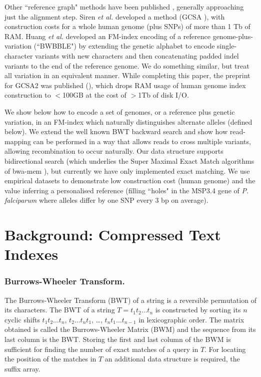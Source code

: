 \documentclass[runningheads,a4paper]{llncs}
\begin{document}
Other ``reference graph" methods have been published \cite{korbinian,siren1,huang}, generally approaching just the alignment step.  Siren \textit{et al.} developed a method (GCSA \cite{siren1}), with construction costs for a whole human genome (plus SNPs) of more than 1 Tb of RAM. Huang \textit{et al.} \cite{huang} developed an FM-index \cite{fmindex} encoding of a reference genome-plus-variation (``BWBBLE") by extending the genetic alphabet to encode single-character variants with new characters and then concatenating padded indel variants to the end of the reference genome. We do something similar, but treat all variation in an equivalent manner.  While completing this paper, the preprint for GCSA2 was published (\cite{siren2}), which drops RAM usage of human genome index construction to $<$100GB at the cost of $>$1Tb of disk I/O.   

 We show below how to encode a set of genomes, or a reference plus  genetic variation, in an FM-index which naturally distinguishes alternate alleles (defined below). We extend the well known BWT backward search and show how read-mapping can be performed in a way that allows reads to cross multiple variants, allowing recombination to occur naturally. Our data structure  supports bidirectional search (which underlies the Super Maximal Exact Match algorithms of bwa-mem \cite{bwa}), but currently we have only implemented exact matching. We use empirical datasets to demonstrate low construction cost (human genome) and the value inferring a personalised reference (filling ``holes" in the MSP3.4 gene of \textit{P. falciparum} where alleles differ by one SNP every 3 bp on average).  


\section{Background: Compressed Text Indexes}

\subsubsection{Burrows-Wheeler Transform.}
The Burrows-Wheeler Transform (BWT) of a string is a reversible permutation of its characters. The BWT of a string $T=t_1t_2 \ldots t_n$ is constructed by sorting its $n$ cyclic shifts $t_1t_2 \ldots t_n$, $t_2 \ldots t_n t_1$, \ldots,  $t_n t_1 \ldots t_{n-1}$ in lexicographic order. The matrix obtained is called the Burrows-Wheeler Matrix (BWM) and the sequence from its last column is the BWT. Storing the first and last column of the BWM is sufficient for finding the number of exact matches of a query in $T$. For locating the position of the matches in $T$ an additional data structure is required, the suffix array. 
\end{document}
